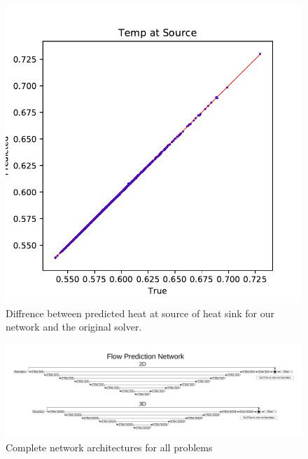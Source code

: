 \documentclass{article} %
\begin{document}
\begin{figure}[h]
\begin{center}
\includegraphics[scale=0.40]{../test/figs/heat_accuracy.pdf}
\end{center}
\caption{Diffrence between predicted heat at source of heat sink for our network and the original solver.}
\label{heat_accuracy}
\end{figure}


\begin{figure}[h]
\begin{center}
\includegraphics[scale=0.45]{./appendix_flow_net.pdf}
\end{center}
\caption{Complete network architectures for all problems}
\label{network_architectures}
\end{figure}
\end{document}
